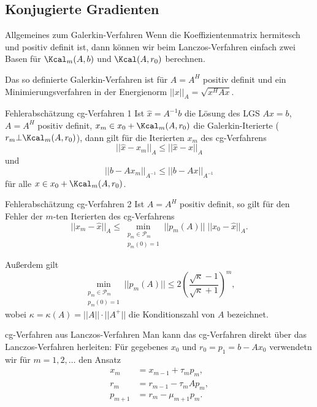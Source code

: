 \subsection{Konjugierte Gradienten}

\begin{karte}{Allgemeines zum Galerkin-Verfahren}
    Wenn die Koeffizientenmatrix hermitesch und 
    positiv definit ist, dann können wir beim Lanczos-Verfahren 
    einfach zwei Basen für \( \Kcal_m(A, b) \) 
    und \( \Kcal(A, r_0) \) berechnen. 

    Das so definierte Galerkin-Verfahren ist für \( A = A^H \)
    positiv definit und ein Minimierungsverfahren in 
    der Energienorm \(||x||_A = \sqrt{x^H Ax}\).
\end{karte}

\begin{karte}{Fehlerabschätzung cg-Verfahren 1}
    Ist \( \widehat{x} = A^{-1}b \) die Lösung 
    des LGS \(Ax=b\), \(A = A^H\) positiv definit, 
    \(x_m \in x_0 + \Kcal_m(A,r_0)\) 
    die Galerkin-Iterierte (\(r_m \bot \Kcal_m(A, r_0)\)),
    dann gilt für die Iterierten \(x_m\) des cg-Verfahrens 
    \[ ||\widehat{x} - x_m||_A \leq ||\widehat{x} - x||_A \]
    und 
    \[ ||b - A x_m||_{A^{-1}} \leq ||b-Ax||_{A^{-1}} \]
    für alle \(x \in x_0 + \Kcal_m(A, r_0)\).
\end{karte}

\begin{karte}{Fehlerabschätzung cg-Verfahren 2}
    Ist \(A = A^H\) positiv definit, so gilt für den Fehler 
    der \(m\)-ten Iterierten des cg-Verfahrens 
    \[ ||x_m - \widehat{x}||_A \leq \min_{\substack{p_m \in \mathcal{P}_m \\ p_m(0) = 1}} 
    ||p_m(A)|| \; ||x_0 - \widehat{x}||_A. \]

    Außerdem gilt 
    \[ \min_{\substack{p_m \in \mathcal{P}_m \\ p_m(0) = 1}} 
    ||p_m(A)|| \leq 2 \left( \frac{\sqrt{\kappa} - 1}{\sqrt{\kappa} + 1} \right)^m, \]
    wobei \(\kappa = \kappa(A) = ||A|| \cdot ||A^+||\) die Konditionszahl von \(A\) bezeichnet.
\end{karte}

\begin{karte}{cg-Verfahren aus Lanczos-Verfahren}
    Man kann das cg-Verfahren direkt über das Lanczos-Verfahren herleiten: 
    Für gegebenes \(x_0\) und \(r_0 = p_1 = b - Ax_0\) 
    verwendetn wir für \( m=1,2,\ldots \) den Ansatz 
    \begin{align*}
        x_m &= x_{m-1} + \tau_m p_m, \\
        r_m &= r_{m-1} - \tau_m A p_m, \\
        p_{m+1} &= r_m - \mu_{m+1} p_m.
    \end{align*}
\end{karte}

